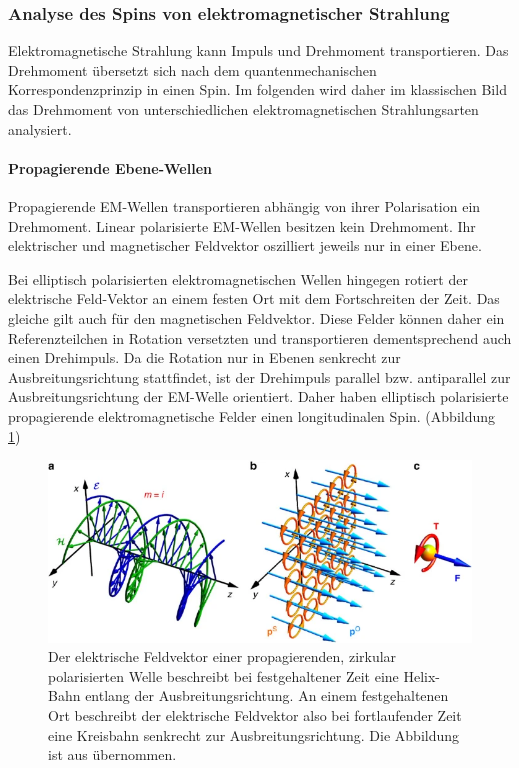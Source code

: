 \documentclass[titlepage]{article}
\begin{document}
	
	
	\subsubsection{Analyse des Spins von elektromagnetischer Strahlung}
	Elektromagnetische Strahlung kann Impuls und Drehmoment transportieren. Das Drehmoment übersetzt sich nach dem quantenmechanischen Korrespondenzprinzip in einen Spin. Im folgenden wird daher im klassischen Bild das Drehmoment von unterschiedlichen elektromagnetischen Strahlungsarten analysiert.
	\paragraph{Propagierende Ebene-Wellen}
	Propagierende EM-Wellen transportieren abhängig von ihrer Polarisation ein Drehmoment. Linear polarisierte EM-Wellen besitzen kein Drehmoment. Ihr elektrischer und magnetischer Feldvektor oszilliert jeweils nur in einer Ebene.
	
	Bei elliptisch polarisierten elektromagnetischen Wellen hingegen rotiert der elektrische Feld-Vektor an einem festen Ort mit dem Fortschreiten der Zeit. Das gleiche gilt auch für den magnetischen Feldvektor. Diese Felder können daher ein Referenzteilchen in Rotation versetzten und transportieren dementsprechend auch einen Drehimpuls. Da die Rotation nur in Ebenen senkrecht zur Ausbreitungsrichtung stattfindet, ist der Drehimpuls parallel bzw. antiparallel zur Ausbreitungsrichtung der EM-Welle orientiert. Daher haben elliptisch polarisierte propagierende elektromagnetische Felder einen longitudinalen Spin. (Abbildung \ref{fig:prop_spin})
	
	\begin{figure}[h]
		\centering
		\includegraphics[width=0.7\linewidth]{figures/spin/prop_spin}
		\caption[Spin propagierende EM-Welle]{Der elektrische Feldvektor einer propagierenden, zirkular polarisierten Welle beschreibt bei festgehaltener Zeit eine Helix-Bahn entlang der Ausbreitungsrichtung. An einem festgehaltenen Ort beschreibt der elektrische Feldvektor also bei fortlaufender Zeit eine Kreisbahn senkrecht zur Ausbreitungsrichtung. Die Abbildung ist aus \cite{Bliokh.2014} übernommen.}
		\label{fig:prop_spin}
	\end{figure}
	
\end{document}

